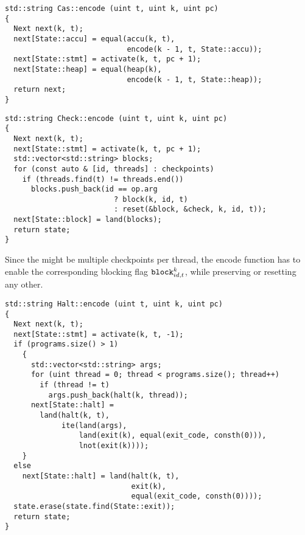 \begin{lstlisting}[style=c++, style=encode]
std::string Cas::encode (uint t, uint k, uint pc)
{
  Next next(k, t);
  next[State::accu] = equal(accu(k, t),
                            encode(k - 1, t, State::accu));
  next[State::stmt] = activate(k, t, pc + 1);
  next[State::heap] = equal(heap(k),
                            encode(k - 1, t, State::heap));
  return next;
}
\end{lstlisting}


\begin{lstlisting}[style=c++, style=encode]
std::string Check::encode (uint t, uint k, uint pc)
{
  Next next(k, t);
  next[State::stmt] = activate(k, t, pc + 1);
  std::vector<std::string> blocks;
  for (const auto & [id, threads] : checkpoints)
    if (threads.find(t) != threads.end())
      blocks.push_back(id == op.arg
                         ? block(k, id, t)
                         : reset(&block, &check, k, id, t));
  next[State::block] = land(blocks);
  return state;
}
\end{lstlisting}

\noindent
Since the might be multiple checkpoints per thread, the encode function
has to enable the corresponding blocking flag $\texttt{block}^k_{id, t}$, while preserving or resetting any other.


\newpage

\begin{lstlisting}[style=c++, style=encode]
std::string Halt::encode (uint t, uint k, uint pc)
{
  Next next(k, t);
  next[State::stmt] = activate(k, t, -1);
  if (programs.size() > 1)
    {
      std::vector<std::string> args;
      for (uint thread = 0; thread < programs.size(); thread++)
        if (thread != t)
          args.push_back(halt(k, thread));
      next[State::halt] =
        land(halt(k, t),
             ite(land(args),
                 land(exit(k), equal(exit_code, consth(0))),
                 lnot(exit(k))));
    }
  else
    next[State::halt] = land(halt(k, t),
                             exit(k),
                             equal(exit_code, consth(0))));
  state.erase(state.find(State::exit));
  return state;
}
\end{lstlisting}

